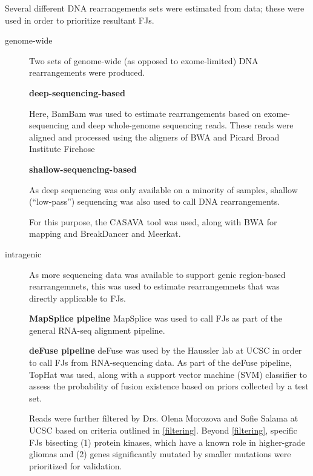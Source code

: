 Several different DNA rearrangements sets were estimated from data;
these were used in order to prioritize resultant FJs.
\begin{description}
\item[genome-wide] Two sets of genome-wide (as opposed to
  exome-limited) DNA rearrangements were produced.

  
  \textbf{deep-sequencing-based}

  
  Here, BamBam\cite{sanborn_double_2013} was used to estimate
  rearrangements based on exome-sequencing and deep whole-genome
  sequencing reads. These reads were aligned and processed using the
  aligners of BWA \cite{li_fast_2009} and Picard \cite{_picard_2016} Broad
  Institute Firehose \cite{_firehose_2016}
  
  \textbf{shallow-sequencing-based}

  As deep sequencing was only available on a minority of samples,
  shallow (``low-pass'') sequencing was also used to call DNA
  rearrangements.

  For this purpose, the CASAVA \cite{_casava_2016} tool was used, along with
  BWA for mapping and BreakDancer\cite{chen_breakdancer_2009} and
  Meerkat\cite{yang_diverse_2013}.




\item[intragenic]

  As more sequencing data was available to support genic region-based
  rearrangemnets, this was used to estimate rearrangemnets that was
  directly applicable to FJs.

  \textbf{MapSplice pipeline} MapSplice\cite{wang_mapsplice:_2010} was
  used to call FJs as part of the general RNA-seq alignment pipeline.


  \textbf{deFuse pipeline} deFuse\cite{mcpherson_defuse:_2011} was
  used by the Haussler lab at UCSC in order to call FJs from
  RNA-sequencing data. As part of the deFuse pipeline,
  TopHat\cite{trapnell_tophat:_2009} was used, along with a support vector machine
  (SVM) classifier to assess the probability of fusion existence based
  on priors collected by a test set.

  Reads were further filtered by Drs. Olena Morozova and Sofie Salama
  at UCSC based on criteria outlined in \ref{filtering}. Beyond
  \ref{filtering}, specific FJs bisecting (1) protein kinases, which
  have a known role in higher-grade gliomas and (2) genes
  significantly mutated by smaller mutations were prioritized for
  validation.


\end{description}
